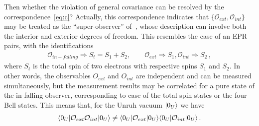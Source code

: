 \documentclass[12pt,a4paper]{article}
\begin{document}
Then whether the violation of general covariance can be resolved by the correspondence~\eqref{eq:c}? Actually, this correspondence indicates that $\{\mathcal{O}_{ext},\mathcal{O}_{int}\}$ may be treated as the ``super-observer'' of~\cite{c}, whose description can involve both the interior and exterior degrees of freedom. This resembles the case of an EPR pairs, with the identifications
\begin{equation}
\label{eq:e}
\begin{split}
\mathcal{O}_{in-falling}\Rightarrow S_t=S_1+S_2,\qquad \mathcal{O}_{ext}\Rightarrow S_1,\mathcal{O}_{int}\Rightarrow S_2 \,,
\end{split}
\end{equation}
where $S_t$ is the total spin of two electrons with respective spins $S_1$ and $S_2$. In other words, the observables $O_{ext}$ and $O_{int}$ are independent and can be measured simultaneously, but the measurement results may be correlated for a pure state of the in-falling observer, corresponding to case of the total spin states or the four Bell states. This means that, for the Unruh vacuum $\arrowvert0_{U}\rangle$ we have
\begin{equation}
\label{eq:f}
\begin{split}
\langle 0_{U}\arrowvert\mathcal{O}_{ext}\mathcal{O}_{int}\arrowvert0_{U}\rangle\neq \langle 0_{U}\arrowvert \mathcal{O}_{ext}\arrowvert0_{U}\rangle\langle 0_{U}\arrowvert \mathcal{O}_{int}\arrowvert0_{U}\rangle\,.
\end{split}
\end{equation}
\end{document}
